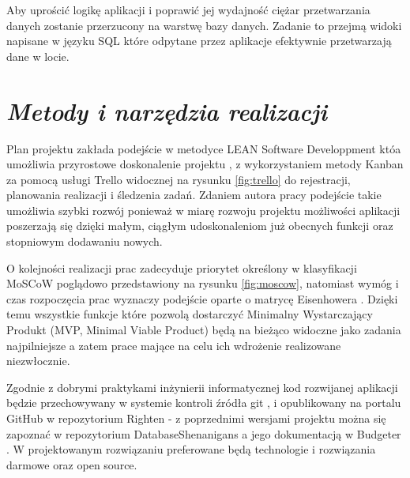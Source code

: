 \documentclass[a4paper, 10pt, twoside, openright]{report}
\newcommand{\customstylesection}[1]{\textbf{\textit{#1}}}
\begin{document}
\begin{large}
{Aby uprościć logikę aplikacji i poprawić jej wydajność ciężar przetwarzania 
danych zostanie przerzucony na warstwę bazy danych. Zadanie to przejmą widoki 
napisane w języku SQL \cite{SQL} które odpytane przez aplikacje efektywnie 
przetwarzają dane w locie.}

\section{\customstylesection{Metody i narzędzia realizacji}}
{Plan projektu zakłada podejście w metodyce LEAN Software Developpment 
\cite{LEAN} któa umożliwia przyrostowe doskonalenie projektu 
\cite{Model Przyrostowy}, z wykorzystaniem metody Kanban \cite{Kanban} za pomocą
 usługi Trello \cite{Trello} widocznej na rysunku \ref*{fig:trello} do 
rejestracji, planowania realizacji i śledzenia zadań. Zdaniem autora pracy 
podejście takie umożliwia szybki rozwój ponieważ w miarę rozwoju projektu 
możliwości aplikacji poszerzają się dzięki małym, ciągłym udoskonaleniom już 
obecnych funkcji oraz stopniowym dodawaniu nowych.}

{O kolejności realizacji prac zadecyduje priorytet określony w klasyfikacji 
MoSCoW \cite{MOSCOW} poglądowo przedstawiony na rysunku \ref{fig:moscow}, 
natomiast wymóg i czas rozpoczęcia prac wyznaczy podejście oparte o matrycę 
Eisenhowera \cite{MatrycaEisenhowera}. Dzięki temu wszystkie funkcje które 
pozwolą dostarczyć Minimalny Wystarczający Produkt (MVP, Minimal Viable Product)
 \cite{MVP} będą na bieżąco widoczne jako zadania najpilniejsze a zatem prace 
mające na celu ich wdrożenie realizowane niezwłocznie.}

{Zgodnie z dobrymi praktykami inżynierii informatycznej kod  rozwijanej 
aplikacji będzie przechowywany w systemie kontroli źródła git \cite{GIT}, i 
opublikowany na portalu GitHub \cite{GitHub} w repozytorium Righten 
\cite{GITRighten} - z poprzednimi wersjami projektu można się zapoznać w 
repozytorium DatabaseShenanigans \cite{GITBudgeterApp} a jego dokumentacją w 
Budgeter \cite{GITBudgeterDoc}. W projektowanym rozwiązaniu preferowane będą 
technologie i rozwiązania darmowe oraz open source.}


\end{large}
\end{document}
